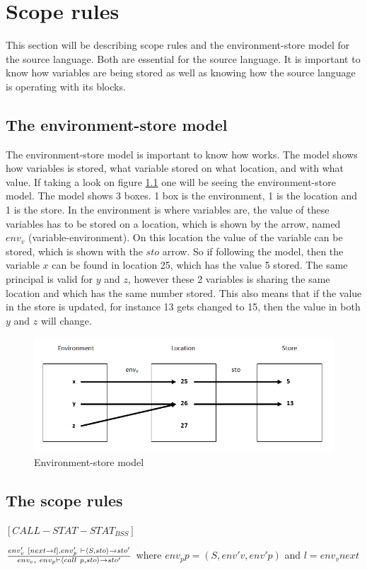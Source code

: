 \chapter{Scope rules}\label{chap:scope-rules}
This section will be describing scope rules and the environment-store model for the source language. Both are essential for the source language. It is important to know how variables are being stored as well as knowing how the source language is operating with its blocks. 

\section{The environment-store model}\label{sec:es-model}
The environment-store model is important to know how works. The model shows how variables is stored, what variable stored on what location, and with what value. If taking a look on figure \ref{fig:esmodel} one will be seeing the environment-store model. The model shows 3 boxes. 1 box is the environment, 1 is the location and 1 is the store. In the environment is where variables are, the value of these variables has to be stored on a location, which is shown by the arrow, named $env_v$ (variable-environment). On this location the value of the variable can be stored, which is shown with the $sto$ arrow. So if following the model, then the variable $x$ can be found in location 25, which has the value 5 stored. The same principal is valid for $y$ and $z$, however these 2 variables is sharing the same location and which has the same number stored. This also means that if the value in the store is updated, for instance 13 gets changed to 15, then the value in both $y$ and $z$ will change. 
\begin{figure}[H]
\includegraphics{billeder/environment_store_model.png}
\caption{Environment-store model}
\label{fig:esmodel}
\end{figure}


\section{The scope rules}\label{sec:scope-rules}



$[CALL-STAT-STAT_{BSS}]$

$env'_{v}~[next \rightarrow l], env'_{p}~ \vdash \langle S,sto \rangle \rightarrow sto' \over env_{v}, ~ env_{p} \vdash \langle call~p, sto \rangle \rightarrow sto'$ 
where $env_{p}p = (S,env'{v},env'{p})$
and $l = env_{v}next$



